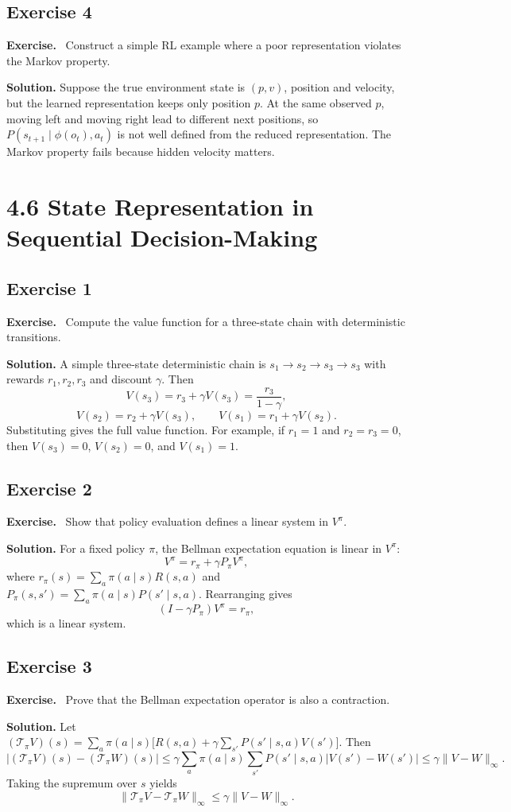 \documentclass[11pt]{article}
\newenvironment{exercisebox}{\begin{framed}\noindent\textbf{Exercise.}\ }{\end{framed}}
\begin{document}
\subsection*{Exercise 4}
\begin{exercisebox}
Construct a simple RL example where a poor representation violates the Markov property.
\end{exercisebox}
\textbf{Solution.} Suppose the true environment state is $(p,v)$, position and velocity, but the learned representation keeps only position $p$. At the same observed $p$, moving left and moving right lead to different next positions, so $P(s_{t+1}\mid \phi(o_t),a_t)$ is not well defined from the reduced representation. The Markov property fails because hidden velocity matters.

\section{4.6 State Representation in Sequential Decision-Making}
\subsection*{Exercise 1}
\begin{exercisebox}
Compute the value function for a three-state chain with deterministic transitions.
\end{exercisebox}
\textbf{Solution.} A simple three-state deterministic chain is $s_1\to s_2\to s_3\to s_3$ with rewards $r_1,r_2,r_3$ and discount $\gamma$. Then
\[
V(s_3)=r_3+\gamma V(s_3)=\frac{r_3}{1-\gamma},
\]
\[
V(s_2)=r_2+\gamma V(s_3),
\qquad
V(s_1)=r_1+\gamma V(s_2).
\]
Substituting gives the full value function. For example, if $r_1=1$ and $r_2=r_3=0$, then $V(s_3)=0$, $V(s_2)=0$, and $V(s_1)=1$.

\subsection*{Exercise 2}
\begin{exercisebox}
Show that policy evaluation defines a linear system in $V^\pi$.
\end{exercisebox}
\textbf{Solution.} For a fixed policy $\pi$, the Bellman expectation equation is linear in $V^\pi$:
\[
V^\pi = r_\pi + \gamma P_\pi V^\pi,
\]
where $r_\pi(s)=\sum_a \pi(a\mid s)R(s,a)$ and $P_\pi(s,s')=\sum_a \pi(a\mid s)P(s'\mid s,a)$. Rearranging gives
\[
(I-\gamma P_\pi)V^\pi=r_\pi,
\]
which is a linear system.

\subsection*{Exercise 3}
\begin{exercisebox}
Prove that the Bellman expectation operator is also a contraction.
\end{exercisebox}
\textbf{Solution.} Let $(\mathcal T_\pi V)(s)=\sum_a\pi(a\mid s)\bigl[R(s,a)+\gamma\sum_{s'}P(s'\mid s,a)V(s')\bigr]$. Then
\[
|(\mathcal T_\pi V)(s)-(\mathcal T_\pi W)(s)|
\le \gamma\sum_a\pi(a\mid s)\sum_{s'}P(s'\mid s,a)|V(s')-W(s')|
\le \gamma\|V-W\|_\infty.
\]
Taking the supremum over $s$ yields
\[
\|\mathcal T_\pi V-\mathcal T_\pi W\|_\infty\le \gamma\|V-W\|_\infty.
\]
\end{document}
